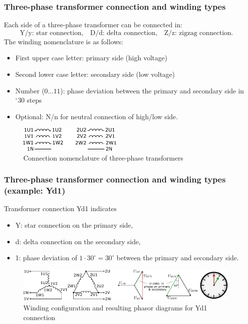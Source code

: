 \begin{frame}
	\frametitle{Three-phase transformer connection and winding types}
		Each side of a three-phase transformer can be connected in:
		\begin{equation*}
			\mbox{Y/y: star connection,}\quad \mbox{D/d: delta connection,}\quad \mbox{Z/z: zigzag connection.}
		\end{equation*} \pause
		The winding nomenclature is as follows:
		\begin{itemize}
			\item First upper case letter: primary side (high voltage) \pause
			\item Second lower case letter: secondary side (low voltage) \pause
			\item Number ($0\ldots 11$): phase deviation between the primary and secondary side in $^\circ 30$ steps \pause
			\item Optional: N/n for neutral connection of  high/low side.
		\end{itemize}
		\begin{figure}
			\includegraphics[width=0.45\textwidth]{fig/lec04/Connection_nomenclature_three_phase_transformer.pdf}
			\caption{Connection nomenclature of three-phase transformers}
			\label{fig:Connection_nomenclature_three_phase_transformer}
		\end{figure}
\end{frame}

\begin{frame}
	\frametitle{Three-phase transformer connection and winding types (example: Yd1)}
	Transformer connection Yd1 indicates
	\begin{itemize}
		\item Y: star connection on the primary side,
		\item d: delta connection on the secondary side,
		\item 1: phase deviation of $1\cdot30^\circ=30^\circ$ between the primary and secondary side.
	\end{itemize}
	\vspace{2em}
	\begin{figure}
		\includegraphics[width=0.99\textwidth]{fig/lec04/Yd1_example.pdf}
		\caption{Winding configuration and resulting phasor diagrams for Yd1 connection}
		\label{fig:Yd1_example}
	\end{figure}
\end{frame}

